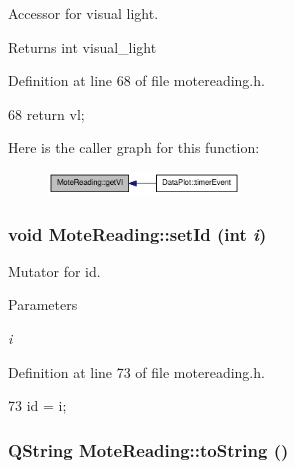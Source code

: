 Accessor for visual light. 

\begin{DoxyReturn}{Returns}
int visual\_\-light 
\end{DoxyReturn}


Definition at line 68 of file motereading.h.




\begin{DoxyCode}
68 { return vl; }
\end{DoxyCode}




Here is the caller graph for this function:\nopagebreak
\begin{figure}[H]
\begin{center}
\leavevmode
\includegraphics[width=144pt]{classMoteReading_a88ed6ea245c7af79e38ff8976f849f36_icgraph}
\end{center}
\end{figure}


\hypertarget{classMoteReading_a61f08f015a9f833ff7352c378b7799c2}{
\subsubsection[{setId}]{\setlength{\rightskip}{0pt plus 5cm}void MoteReading::setId (int {\em i})}}
\label{classMoteReading_a61f08f015a9f833ff7352c378b7799c2}


Mutator for id. 


\begin{DoxyParams}{Parameters}
\item[{\em i}]\end{DoxyParams}


Definition at line 73 of file motereading.h.




\begin{DoxyCode}
73 { id = i; }
\end{DoxyCode}


\hypertarget{classMoteReading_a5e60715c001c14f3e3f4cff6f886f0ad}{
\subsubsection[{toString}]{\setlength{\rightskip}{0pt plus 5cm}QString MoteReading::toString ()}}
\label{classMoteReading_a5e60715c001c14f3e3f4cff6f886f0ad}


